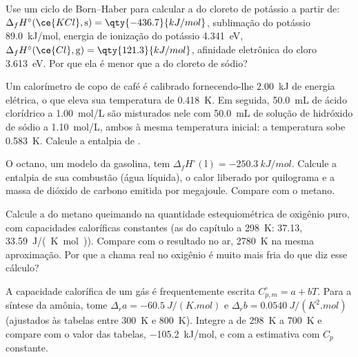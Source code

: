 \begin{exercise}[$\star\star$]\label{exo:b2:reaction-enthalpy:7}
Use um ciclo de Born--Haber para calcular a  do cloreto de
potássio a partir de: $\Delta_f H^\circ(\ce{KCl}, \text{s}) = \qty{-436.7}{kJ/mol}$,
sublimação do potássio \qty{89.0}{kJ/mol}, energia de ionização do
potássio \qty{4.341}{eV}, $\Delta_f H^\circ(\ce{Cl}, \text{g}) =
\qty{121.3}{kJ/mol}$, afinidade eletrônica do cloro \qty{3.613}{eV}. Por que
ela é menor que a do cloreto de sódio?
\end{exercise}

\begin{exercise}[$\star\star$]\label{exo:b2:reaction-enthalpy:8}
Um calorímetro de copo de café é calibrado fornecendo-lhe \qty{2.00}{kJ} de
energia elétrica, o que eleva sua temperatura de \qty{0.418}{K}. Em seguida,
\qty{50.0}{mL} de ácido clorídrico a \qty{1.00}{mol/L} são misturados nele
com \qty{50.0}{mL} de solução de hidróxido de sódio a \qty{1.10}{mol/L},
ambos à mesma temperatura inicial: a temperatura sobe
\qty{0.583}{K}. Calcule a entalpia de .
\end{exercise}

\begin{exercise}[$\star\star$]\label{exo:b2:reaction-enthalpy:9}
O octano, um modelo da gasolina, tem $\Delta_f H^\circ(\text{l}) =
\qty{-250.3}{kJ/mol}$. Calcule a entalpia de sua combustão (água
líquida), o calor liberado por quilograma e a massa de dióxido de carbono
emitida por megajoule. Compare com o metano.
\end{exercise}

\begin{exercise}[$\star\star\star$]\label{exo:b2:reaction-enthalpy:10}
Calcule a  do metano queimando na
quantidade estequiométrica de oxigênio puro, com capacidades caloríficas
constantes (as do capítulo a \qty{298}{K}:  37.13, 
\qty{33.59}{J/(K.mol)}). Compare com o resultado no ar,
\qty{2780}{K} na mesma aproximação. Por que a chama real no oxigênio é
muito mais fria do que diz esse cálculo?
\end{exercise}

\begin{exercise}[$\star\star\star$]\label{exo:b2:reaction-enthalpy:11}
A capacidade calorífica de um gás é frequentemente escrita $C_{p,m}^\circ = a + bT$. Para
a síntese da amônia, tome $\Delta_r a = \qty{-60.5}{J/(K.mol)}$ e
$\Delta_r b = \qty{0.0540}{J/(K^2.mol)}$ (ajustados às tabelas entre
\qty{300}{K} e \qty{800}{K}). Integre a  de
\qty{298}{K} a \qty{700}{K} e compare com o valor das tabelas,
\qty{-105.2}{kJ/mol}, e com a estimativa com $C_p$ constante.
\end{exercise}

